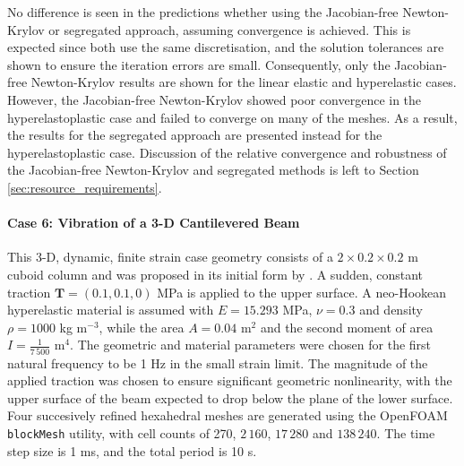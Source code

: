 \documentclass[sn-mathphys,Numbered]{sn-jnl}%
\newcommand{\bb}{\boldsymbol}
\begin{document}
No difference is seen in the predictions whether using the Jacobian-free Newton-Krylov or segregated approach, assuming convergence is achieved.
This is expected since both use the same discretisation, and the solution tolerances are shown to ensure the iteration errors are small.
Consequently, only the Jacobian-free Newton-Krylov results are shown for the linear elastic and hyperelastic cases.
However, the Jacobian-free Newton-Krylov showed poor convergence in the hyperelastoplastic case and failed to converge on many of the meshes.
As a result, the results for the segregated approach are presented instead for the hyperelastoplastic case.
Discussion of the relative convergence and robustness of the Jacobian-free Newton-Krylov and segregated methods is left to Section \ref{sec:resource_requirements}.



\paragraph{Case 6: Vibration of a 3-D Cantilevered Beam}
This 3-D, dynamic, finite strain case geometry consists of a $2 \times 0.2 \times 0.2$ m cuboid column and was proposed in its initial form by \citet{Tukovic2007}.
A sudden, constant traction $\bb{T} = \left(0.1, 0.1, 0 \right)$ MPa is applied to the upper surface.
A neo-Hookean hyperelastic material is assumed with $E = 15.293$ MPa, $\nu = 0.3$ and density $\rho = 1000$ kg m$^{-3}$, while the area $A = 0.04$ m$^2$ and the second moment of area $I = \frac{1}{7\,500}$ m$^4$. %
The geometric and material parameters were chosen for the first natural frequency to be 1 Hz in the small strain limit.
The magnitude of the applied traction was chosen to ensure significant geometric nonlinearity, with the upper surface of the beam expected to drop below the plane of the lower surface.
Four succesively refined hexahedral meshes are generated using the OpenFOAM \texttt{blockMesh} utility, with cell counts of 270, $2\,160$, $17\,280$ and $138\,240$.
The time step size is 1 ms, and the total period is 10 s.
\end{document}
